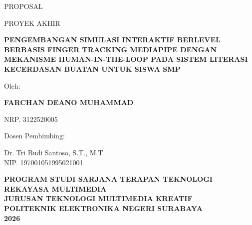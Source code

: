 \documentclass[12pt,oneside]{report}
\begin{document}

\begin{titlepage}
\begin{center}

\vspace*{1cm}

{\large PROPOSAL}

\vspace{0.5cm}

{\large PROYEK AKHIR}

\vspace{2cm}

{\bfseries\MakeUppercase{PENGEMBANGAN SIMULASI INTERAKTIF BERLEVEL BERBASIS FINGER TRACKING MEDIAPIPE DENGAN MEKANISME HUMAN-IN-THE-LOOP PADA SISTEM LITERASI KECERDASAN BUATAN UNTUK SISWA SMP}}

\vspace{2cm}

{\large Oleh:}

\vspace{0.5cm}

{\large \bfseries FARCHAN DEANO MUHAMMAD}

\vspace{0.2cm}

{\large NRP. 3122520005}

\vspace{2cm}

{\large Dosen Pembimbing:}

\vspace{0.3cm}

{\large Dr. Tri Budi Santoso, S.T., M.T.}\\
{\large NIP. 197001051995021001}

\vspace{1.5cm}

{\large \bfseries PROGRAM STUDI SARJANA TERAPAN TEKNOLOGI REKAYASA MULTIMEDIA}\\
{\large \bfseries JURUSAN TEKNOLOGI MULTIMEDIA KREATIF}\\
{\large \bfseries POLITEKNIK ELEKTRONIKA NEGERI SURABAYA}\\
{\large \bfseries 2026}

\end{center}
\end{titlepage}

\end{document}
